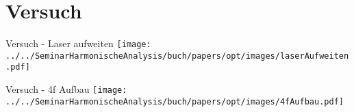 \section{Versuch}

\begin{frame}{Versuch - Laser aufweiten}
    \centering
    \texttt{[image: ../../SeminarHarmonischeAnalysis/buch/papers/opt/images/laserAufweiten.pdf]}
\end{frame}

\begin{frame}{Versuch - 4f Aufbau}
    \texttt{[image: ../../SeminarHarmonischeAnalysis/buch/papers/opt/images/4fAufbau.pdf]}
\end{frame}
